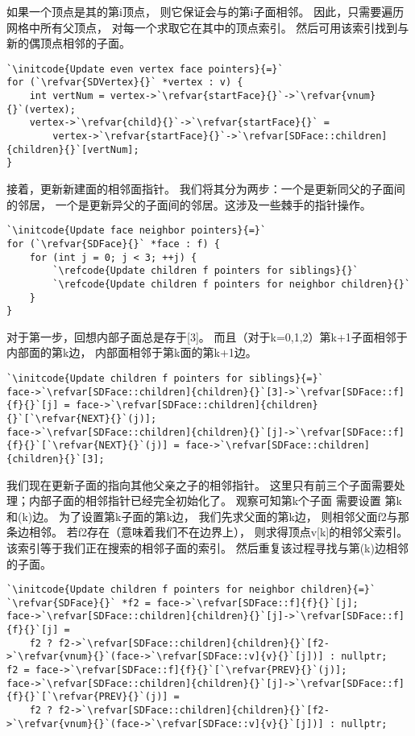 如果一个顶点是其的第{\ttfamily i}顶点，
则它保证会与的第{\ttfamily i}子面相邻。
因此，只需要遍历网格中所有父顶点，
对每一个求取它在其中的顶点索引。
然后可用该索引找到与新的偶顶点相邻的子面。
\begin{lstlisting}
`\initcode{Update even vertex face pointers}{=}`
for (`\refvar{SDVertex}{}` *vertex : v) {
    int vertNum = vertex->`\refvar{startFace}{}`->`\refvar{vnum}{}`(vertex);
    vertex->`\refvar{child}{}`->`\refvar{startFace}{}` = 
        vertex->`\refvar{startFace}{}`->`\refvar[SDFace::children]{children}{}`[vertNum];
}
\end{lstlisting}

接着，更新新建面的相邻面指针。
我们将其分为两步：一个是更新同父的子面间的邻居，
一个是更新异父的子面间的邻居。这涉及一些棘手的指针操作。
\begin{lstlisting}
`\initcode{Update face neighbor pointers}{=}`
for (`\refvar{SDFace}{}` *face : f) {
    for (int j = 0; j < 3; ++j) {
        `\refcode{Update children f pointers for siblings}{}`
        `\refcode{Update children f pointers for neighbor children}{}`
    }
}
\end{lstlisting}

对于第一步，回想内部子面总是存于{\ttfamily{}[3]}。
而且（对于{\ttfamily k}=0,1,2）第{\ttfamily k+1}子面相邻于内部面的第{\ttfamily k}边，
内部面相邻于第{\ttfamily k}面的第{\ttfamily k+1}边。
\begin{lstlisting}
`\initcode{Update children f pointers for siblings}{=}`
face->`\refvar[SDFace::children]{children}{}`[3]->`\refvar[SDFace::f]{f}{}`[j] = face->`\refvar[SDFace::children]{children}{}`[`\refvar{NEXT}{}`(j)];
face->`\refvar[SDFace::children]{children}{}`[j]->`\refvar[SDFace::f]{f}{}`[`\refvar{NEXT}{}`(j)] = face->`\refvar[SDFace::children]{children}{}`[3];
\end{lstlisting}

我们现在更新子面的指向其他父亲之子的相邻指针。
这里只有前三个子面需要处理；内部子面的相邻指针已经完全初始化了。
观察可知第{\ttfamily k}个子面
需要设置
第{\ttfamily k}和{\ttfamily{}(k)}边。
为了设置第{\ttfamily k}子面的第{\ttfamily k}边，
我们先求父面的第{\ttfamily k}边，
则相邻父面{\ttfamily f2}与那条边相邻。
若{\ttfamily f2}存在（意味着我们不在边界上），
则求得顶点{\ttfamily v[k]}的相邻父索引。
该索引等于我们正在搜索的相邻子面的索引。
然后重复该过程寻找与第{\ttfamily{}(k)}边相邻的子面。
\begin{lstlisting}
`\initcode{Update children f pointers for neighbor children}{=}`
`\refvar{SDFace}{}` *f2 = face->`\refvar[SDFace::f]{f}{}`[j];
face->`\refvar[SDFace::children]{children}{}`[j]->`\refvar[SDFace::f]{f}{}`[j] =
    f2 ? f2->`\refvar[SDFace::children]{children}{}`[f2->`\refvar{vnum}{}`(face->`\refvar[SDFace::v]{v}{}`[j])] : nullptr;
f2 = face->`\refvar[SDFace::f]{f}{}`[`\refvar{PREV}{}`(j)];
face->`\refvar[SDFace::children]{children}{}`[j]->`\refvar[SDFace::f]{f}{}`[`\refvar{PREV}{}`(j)] = 
    f2 ? f2->`\refvar[SDFace::children]{children}{}`[f2->`\refvar{vnum}{}`(face->`\refvar[SDFace::v]{v}{}`[j])] : nullptr;
\end{lstlisting}


